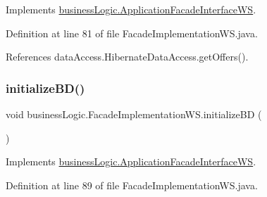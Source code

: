 Implements \mbox{\hyperlink{interfacebusinessLogic_1_1ApplicationFacadeInterfaceWS_ae338a96d039003c64fceb68d667736f1}{business\+Logic.\+Application\+Facade\+Interface\+WS}}.



Definition at line 81 of file Facade\+Implementation\+W\+S.\+java.


\begin{DoxyCode}{0}

\end{DoxyCode}


References data\+Access.\+Hibernate\+Data\+Access.\+get\+Offers().

\mbox{\label{classbusinessLogic_1_1FacadeImplementationWS_a94a4600e9c80794676f06c888e9e682d}} 
\subsubsection{\texorpdfstring{initializeBD()}{initializeBD()}}
{\footnotesize\ttfamily void business\+Logic.\+Facade\+Implementation\+W\+S.\+initialize\+BD (\begin{DoxyParamCaption}{ }\end{DoxyParamCaption})}



Implements \mbox{\hyperlink{interfacebusinessLogic_1_1ApplicationFacadeInterfaceWS_a59eacfa5890466c6a338d0df2e487965}{business\+Logic.\+Application\+Facade\+Interface\+WS}}.



Definition at line 89 of file Facade\+Implementation\+W\+S.\+java.


